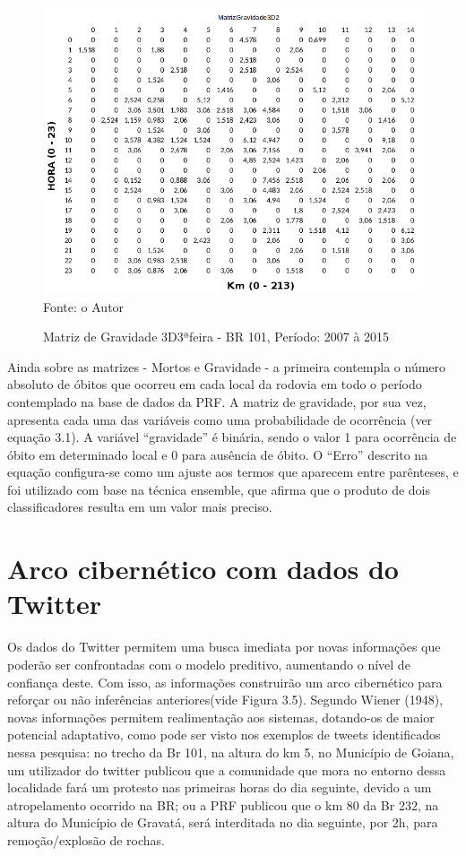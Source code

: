  
 \begin{figure}[!ht]
 	\centering
 	\caption{Matriz de Gravidade 3D3ªfeira - BR 101, Período: 2007 à 2015}
 	\label{fig:MatrizGravidade3D2}
 	\includegraphics[width=0.7\linewidth]{Figuras/Metodologia/MatrizGravidade3D2.png}\\
 	\tiny Fonte: o Autor
 \end{figure}



Ainda sobre as matrizes - Mortos e Gravidade - a primeira contempla o número absoluto de óbitos que ocorreu em cada local da rodovia em todo o período contemplado na base de dados da PRF. A matriz de gravidade, por sua vez, apresenta cada uma das variáveis como uma probabilidade de ocorrência (ver equação 3.1). A variável ``gravidade'' é binária, sendo o valor 1 para ocorrência de óbito em determinado local e 0 para ausência de óbito. O ``Erro'' descrito na equação configura-se como um ajuste aos termos que aparecem entre parênteses, e foi utilizado com base na técnica ensemble, que afirma que o produto de dois classificadores resulta em um valor mais preciso.    

\section{Arco cibernético com dados do Twitter}

Os dados do Twitter permitem uma busca imediata por novas informações que poderão ser confrontadas com o 
modelo preditivo, aumentando o nível de confiança deste. Com isso, as informações construirão um arco cibernético para reforçar ou não inferências anteriores(vide Figura 3.5). Segundo Wiener (1948), novas informações permitem realimentação aos sistemas, dotando-os de maior potencial adaptativo, como pode ser visto nos exemplos de tweets identificados nessa pesquisa: no trecho da Br 101, na altura do km 5, no 
Município de Goiana, um utilizador do twitter publicou que a comunidade que mora no entorno dessa localidade fará um protesto nas primeiras horas do dia seguinte, devido a um  
atropelamento ocorrido na BR; ou a PRF publicou que o km 80 da Br 232, na altura do Município de Gravatá, será interditada no dia seguinte, por 2h, para 
remoção/explosão de rochas.


